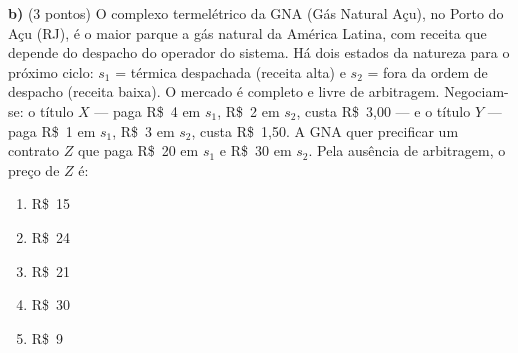 \textbf{b)} (3 pontos) O complexo termelétrico da GNA (Gás Natural Açu), no Porto do Açu (RJ), é o maior parque a gás natural da América Latina, com receita que depende do despacho do operador do sistema. Há dois estados da natureza para o próximo ciclo: $s_1$ = térmica despachada (receita alta) e $s_2$ = fora da ordem de despacho (receita baixa). O mercado é completo e livre de arbitragem. Negociam-se: o título $X$ --- paga R\$~4 em $s_1$, R\$~2 em $s_2$, custa R\$~3{,}00 --- e o título $Y$ --- paga R\$~1 em $s_1$, R\$~3 em $s_2$, custa R\$~1{,}50. A GNA quer precificar um contrato $Z$ que paga R\$~20 em $s_1$ e R\$~30 em $s_2$. Pela ausência de arbitragem, o preço de $Z$ é:

\begin{enumerate}[label=\Alph*., leftmargin=3.2em, itemsep=0.15em, topsep=0.2em]
  \item R\$~15
  \item R\$~24
  \item R\$~21
  \item R\$~30
  \item R\$~9
\end{enumerate}
